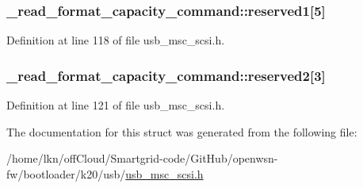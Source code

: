 \subsubsection[{\texorpdfstring{reserved1}{reserved1}}]{ \+\_\+read\+\_\+format\+\_\+capacity\+\_\+command\+::reserved1\mbox{[}5\mbox{]}}\hypertarget{struct__read__format__capacity__command_a9276d48b097e089f3da46b12183be1d4}{}\label{struct__read__format__capacity__command_a9276d48b097e089f3da46b12183be1d4}


Definition at line 118 of file usb\+\_\+msc\+\_\+scsi.\+h.

\subsubsection[{\texorpdfstring{reserved2}{reserved2}}]{ \+\_\+read\+\_\+format\+\_\+capacity\+\_\+command\+::reserved2\mbox{[}3\mbox{]}}\hypertarget{struct__read__format__capacity__command_aedbf0fdddfce142da7648fe1f4c60688}{}\label{struct__read__format__capacity__command_aedbf0fdddfce142da7648fe1f4c60688}


Definition at line 121 of file usb\+\_\+msc\+\_\+scsi.\+h.



The documentation for this struct was generated from the following file\+:\begin{DoxyCompactItemize}
\item 
/home/lkn/off\+Cloud/\+Smartgrid-\/code/\+Git\+Hub/openwsn-\/fw/bootloader/k20/usb/\hyperlink{usb__msc__scsi_8h}{usb\+\_\+msc\+\_\+scsi.\+h}\end{DoxyCompactItemize}
